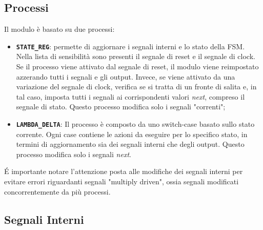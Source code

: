 \documentclass{article}
\begin{document}
\vspace{0.75cm}
\subsection{Processi}
Il modulo è basato su due processi:
\begin{itemize}[label=\raisebox{0.25ex}{\tiny$\bullet$}]
    \item \texttt{\textbf{STATE\_REG}}: permette di aggiornare i segnali interni e lo stato della FSM. Nella lista di sensibilità sono presenti il segnale di reset e il segnale di clock.
    \\ Se il processo viene attivato dal segnale di reset, il modulo viene reimpostato azzerando tutti i segnali e gli output. Invece, se viene attivato da una variazione del segnale di clock, verifica se si tratta di un fronte di salita e, in tal caso, imposta tutti i segnali ai corrispondenti valori \textit{next}, compreso il segnale di stato. Questo processo modifica solo i segnali "correnti";
    \item \texttt{\textbf{LAMBDA\_DELTA}}: Il processo è composto da uno switch-case basato sullo stato corrente. Ogni case contiene le azioni da eseguire per lo specifico stato, in termini di aggiornamento sia dei segnali interni che degli output. Questo processo modifica solo i segnali \textit{next}.
\end{itemize}
É importante notare l'attenzione posta alle modifiche dei segnali interni per evitare errori riguardanti segnali "multiply driven", ossia segnali modificati concorrentemente da più processi.
\vspace{0.75cm}
\subsection{Segnali Interni}
\end{document}
